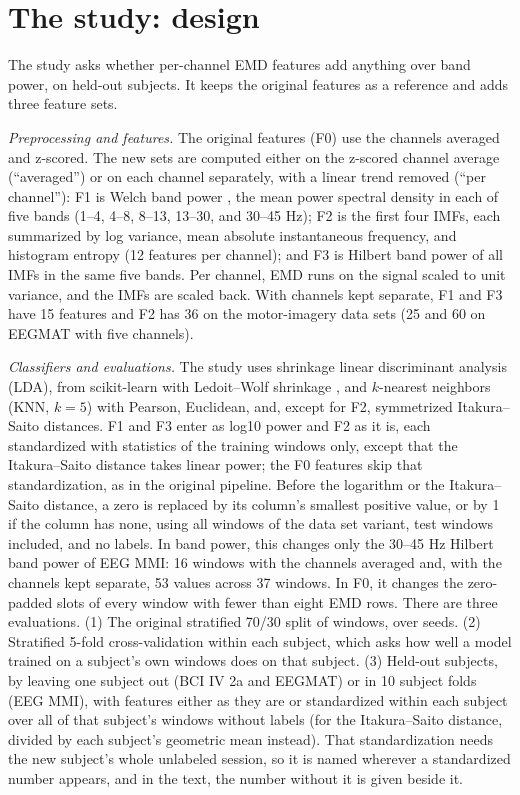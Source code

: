 \section{The study: design}
\label{sec:design}

The study asks whether per-channel EMD features add anything over band power, on held-out subjects. It keeps the original features as a reference and adds three feature sets.

\emph{Preprocessing and features.} The original features (F0) use the channels averaged and z-scored. The new sets are computed either on the z-scored channel average (``averaged'') or on each channel separately, with a linear trend removed (``per channel''): F1 is Welch band power \cite{welch1967}, the mean power spectral density in each of five bands (1--4, 4--8, 8--13, 13--30, and 30--45 Hz); F2 is the first four IMFs, each summarized by log variance, mean absolute instantaneous frequency, and histogram entropy (12 features per channel); and F3 is Hilbert band power of all IMFs in the same five bands. Per channel, EMD runs on the signal scaled to unit variance, and the IMFs are scaled back. With channels kept separate, F1 and F3 have 15 features and F2 has 36 on the motor-imagery data sets (25 and 60 on EEGMAT with five channels).

\emph{Classifiers and evaluations.} The study uses shrinkage linear discriminant analysis (LDA), from scikit-learn \cite{pedregosa2011} with Ledoit--Wolf shrinkage \cite{ledoit2004}, and $k$-nearest neighbors (KNN, $k = 5$) with Pearson, Euclidean, and, except for F2, symmetrized Itakura--Saito \cite{itakura1968} distances. F1 and F3 enter as log10 power and F2 as it is, each standardized with statistics of the training windows only, except that the Itakura--Saito distance takes linear power; the F0 features skip that standardization, as in the original pipeline. Before the logarithm or the Itakura--Saito distance, a zero is replaced by its column's smallest positive value, or by 1 if the column has none, using all windows of the data set variant, test windows included, and no labels. In band power, this changes only the 30--45 Hz Hilbert band power of EEG MMI: 16 windows with the channels averaged and, with the channels kept separate, 53 values across 37 windows. In F0, it changes the zero-padded slots of every window with fewer than eight EMD rows. There are three evaluations. (1) The original stratified 70/30 split of windows, over  seeds. (2) Stratified 5-fold cross-validation within each subject, which asks how well a model trained on a subject's own windows does on that subject. (3) Held-out subjects, by leaving one subject out (BCI IV 2a and EEGMAT) or in 10 subject folds (EEG MMI), with features either as they are or standardized within each subject over all of that subject's windows without labels (for the Itakura--Saito distance, divided by each subject's geometric mean instead). That standardization needs the new subject's whole unlabeled session, so it is named wherever a standardized number appears, and in the text, the number without it is given beside it.

